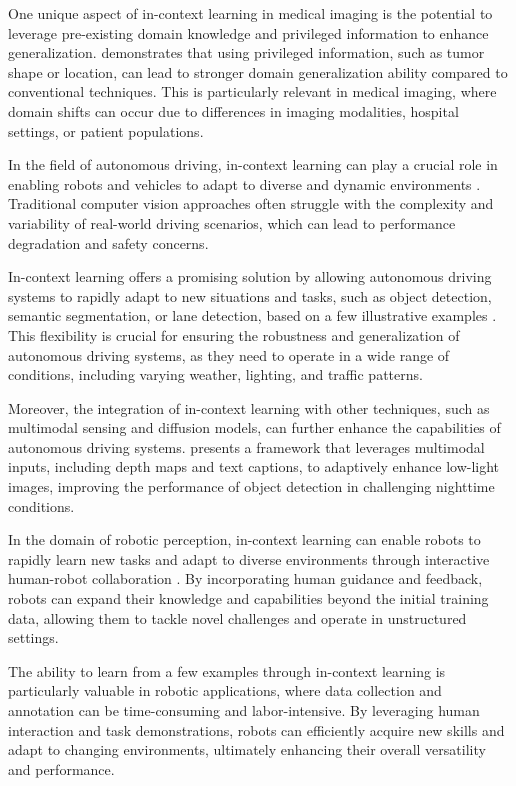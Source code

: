 \documentclass[11pt]{article}
\begin{document}
One unique aspect of in-context learning in medical imaging is the potential to leverage pre-existing domain knowledge and privileged information to enhance generalization. \cite{ref254} demonstrates that using privileged information, such as tumor shape or location, can lead to stronger domain generalization ability compared to conventional techniques. This is particularly relevant in medical imaging, where domain shifts can occur due to differences in imaging modalities, hospital settings, or patient populations.

In the field of autonomous driving, in-context learning can play a crucial role in enabling robots and vehicles to adapt to diverse and dynamic environments \cite{ref255,ref256}. Traditional computer vision approaches often struggle with the complexity and variability of real-world driving scenarios, which can lead to performance degradation and safety concerns.

In-context learning offers a promising solution by allowing autonomous driving systems to rapidly adapt to new situations and tasks, such as object detection, semantic segmentation, or lane detection, based on a few illustrative examples \cite{ref257,ref258}. This flexibility is crucial for ensuring the robustness and generalization of autonomous driving systems, as they need to operate in a wide range of conditions, including varying weather, lighting, and traffic patterns.

Moreover, the integration of in-context learning with other techniques, such as multimodal sensing and diffusion models, can further enhance the capabilities of autonomous driving systems. \cite{ref256} presents a framework that leverages multimodal inputs, including depth maps and text captions, to adaptively enhance low-light images, improving the performance of object detection in challenging nighttime conditions.

In the domain of robotic perception, in-context learning can enable robots to rapidly learn new tasks and adapt to diverse environments through interactive human-robot collaboration \cite{ref258,ref259}. By incorporating human guidance and feedback, robots can expand their knowledge and capabilities beyond the initial training data, allowing them to tackle novel challenges and operate in unstructured settings.

The ability to learn from a few examples through in-context learning is particularly valuable in robotic applications, where data collection and annotation can be time-consuming and labor-intensive. By leveraging human interaction and task demonstrations, robots can efficiently acquire new skills and adapt to changing environments, ultimately enhancing their overall versatility and performance.
\end{document}
